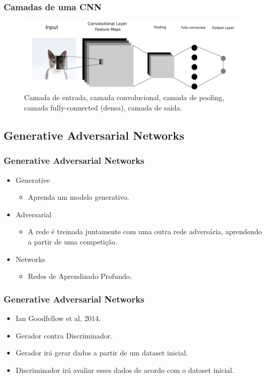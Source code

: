 \documentclass{beamer}
\begin{document}
\begin{frame}
\frametitle{Camadas de uma CNN}
\begin{figure}
\includegraphics[width=1\linewidth]{images/cnn}
\caption{Camada de entrada, camada convolucional, camada de pooling, camada fully-connected (densa), camada de saída.}
\end{figure}
\end{frame}

\subsection{Generative Adversarial Networks}

\begin{frame}
\frametitle{Generative Adversarial Networks}
\begin{itemize}
\item Generative
\begin{itemize}
\item Aprenda um modelo generativo.
\end{itemize}
\item Adversarial
\begin{itemize}
\item A rede é treinada juntamente com uma outra rede adversária, aprendendo a partir de uma competição.
\end{itemize}
\item Networks
\begin{itemize}
\item Redes de Aprendizado Profundo.
\end{itemize}
\end{itemize}
\end{frame}

\begin{frame}
\frametitle{Generative Adversarial Networks}
\begin{itemize}
\item Ian Goodfellow et al, 2014.
\item Gerador contra Discriminador.
\item Gerador irá gerar dados a partir de um dataset inicial.
\item Discriminador irá avaliar esses dados de acordo com o dataset inicial.
\end{itemize}
\end{frame}
\end{document}
